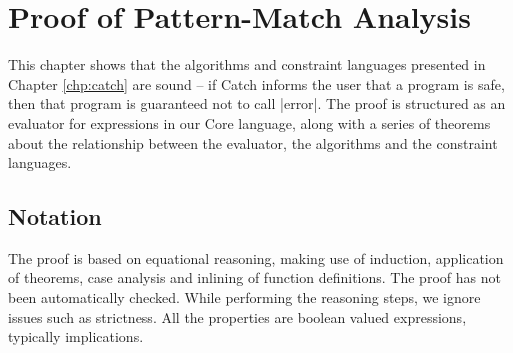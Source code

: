 \begin{comment}
-- equality substitution, replacing items
class SubstRep a b c | a c -> b, c b -> a, a b -> c where (/#) :: a -> b -> c
instance SubstRep (Prop (Sat a)) ([a], [b]) (Prop (Sat b))
instance SubstRep VarName ([VarName], [Expr]) Expr

instance Eq Value
instance Eq Expr

alt :: Alt -> Prop (Sat a)
pre' :: String -> [Expr] -> Prop (Sat Expr)
sub :: ([VarName],[Expr])

-- for BP
anys :: String -> Constraint
\end{code}

\h{#mp}\begin{code}
-- for MP
type Constraint = [Val]
data Val = [Pattern] :* [Pattern] | Any
data Pattern = Pattern CtorName [Val]
complete :: CtorName -> Pattern
nonRecs :: CtorName -> [Int]
merge :: [Pattern] -> [Pattern] -> [Pattern]
non :: [Int]
rec :: [Int]
\end{code}
\end{comment}


\chapter{Proof of Pattern-Match Analysis}
\label{chp:proof}

\newcommand{\lemma}[1]{(\textit{#1})}
\newcommand{\theorem}[2]{\lemma{#1} \vspace{-1mm} \\ \nopagebreak #2 }
\newcommand{\proof}[2][]{\textbf{Proof of \lemma{#2} \textsf{#1}} \\  \nopagebreak}

This chapter shows that the algorithms and constraint languages presented in Chapter \ref{chp:catch} are sound -- if Catch informs the user that a program is safe, then that program is guaranteed not to call |error|. The proof is structured as an evaluator for expressions in our Core language, along with a series of theorems about the relationship between the evaluator, the algorithms and the constraint languages.

\section{Notation}

The proof is based on equational reasoning, making use of induction, application of theorems, case analysis and inlining of function definitions. The proof has not been automatically checked. While performing the reasoning steps, we ignore issues such as strictness. All the properties are boolean valued expressions, typically implications.

